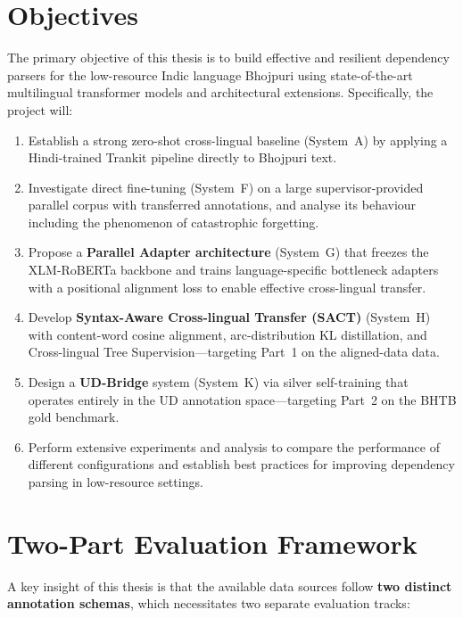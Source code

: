 \documentclass[12pt,a4paper,oneside]{report}
\newcommand{\bho}{Bhojpuri}
\newcommand{\hi}{Hindi}
\newcommand{\xlmr}{XLM-RoBERTa}
\begin{document}
\section{Objectives}

The primary objective of this thesis is to build effective and resilient dependency
parsers for the low-resource Indic language \bho{} using state-of-the-art multilingual
transformer models and architectural extensions. Specifically, the project will:

\begin{enumerate}
  \item Establish a strong zero-shot cross-lingual baseline (System~A) by applying a
        \hi{}-trained Trankit pipeline directly to \bho{} text.
  \item Investigate direct fine-tuning (System~F) on a large supervisor-provided
        parallel corpus with transferred annotations, and analyse its behaviour
        including the phenomenon of catastrophic forgetting.
  \item Propose a \textbf{Parallel Adapter architecture} (System~G) that freezes the
        \xlmr{} backbone and trains language-specific bottleneck adapters with a
        positional alignment loss to enable effective cross-lingual transfer.
  \item Develop \textbf{Syntax-Aware Cross-lingual Transfer (SACT)} (System~H) with
        content-word cosine alignment, arc-distribution KL distillation, and
        Cross-lingual Tree Supervision---targeting Part~1 on the aligned-data
        data.
  \item Design a \textbf{UD-Bridge} system (System~K) via silver self-training that
        operates entirely in the UD annotation space---targeting Part~2 on the
        BHTB gold benchmark.
  \item Perform extensive experiments and analysis to compare the performance of
        different configurations and establish best practices for improving dependency
        parsing in low-resource settings.
\end{enumerate}

\section{Two-Part Evaluation Framework}
\label{sec:two_parts}

A key insight of this thesis is that the available data sources follow \textbf{two
distinct annotation schemas}, which necessitates two separate evaluation tracks:
\end{document}
